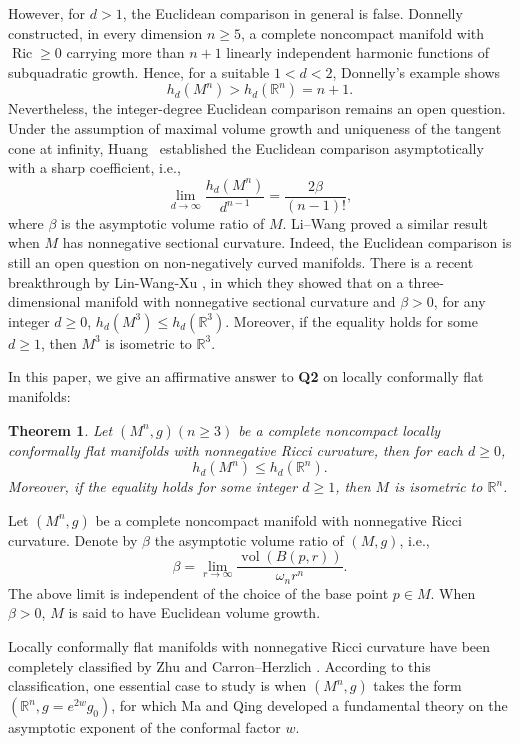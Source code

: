 \documentclass[12pt]{amsart}
\theoremstyle{plain}
\newtheorem{theoremx}{Theorem}
\theoremstyle{definition}
\theoremstyle{remark}     %
\numberwithin{equation}{section}
\begin{document}
However, for $d>1$, the Euclidean comparison in general is false. Donnelly \cite{D} constructed, in every dimension $n\ge5$, a complete noncompact manifold with $\operatorname{Ric}\ge0$ carrying more than $n+1$ linearly independent harmonic functions of subquadratic growth. Hence, for a suitable $1<d<2$, Donnelly’s example shows
\[
h_d(M^n)>h_d(\mathbb R^n)=n+1.
\]
Nevertheless, the integer-degree Euclidean comparison remains an open question. Under the assumption of maximal volume growth and uniqueness of the tangent cone at infinity, Huang~\cite{H1,H2} established the Euclidean comparison asymptotically with a sharp coefficient, i.e., 
\[
\lim_{d\to \infty} \frac{h_d(M^n)}{d^{n-1}}= \frac{2\beta}{(n-1)!}, 
\]
where $\beta$ is the asymptotic volume ratio of $M$.
Li--Wang \cite{LW} proved a similar result when $M$ has nonnegative sectional curvature. Indeed, the Euclidean comparison is still an open question on non-negatively curved manifolds. There is a recent breakthrough by Lin-Wang-Xu \cite{LWX}, in which they showed that on a three-dimensional manifold with nonnegative sectional curvature and $\beta>0$, for any integer $d\geq 0$, $h_d(M^3)\leq h_d(\mathbb{R}^3)$. Moreover, if the equality holds for some $d\geq 1$, then $M^3$ is isometric to $\mathbb{R}^3$. 

In this paper, we give an affirmative answer to {\bf Q2} on locally conformally flat manifolds:  

\begin{theoremx} \label{thm:A}
Let $(M^n,g) (n\geq 3)$ be a complete noncompact locally conformally flat manifolds with nonnegative Ricci curvature, then for each $d\geq 0$,
\[
h_d(M^n) \leq h_d (\mathbb{R}^n). 
\]
Moreover, if the equality holds for some integer $d\geq 1$, then $M$ is isometric to $\mathbb{R}^n$.    
\end{theoremx}

Let  $(M^n,g)$ be a complete noncompact manifold with nonnegative Ricci curvature. Denote by $\beta$ the asymptotic volume ratio of $(M,g)$, i.e., \[
    \beta=\lim_{r\to \infty}\frac{\operatorname{vol}(B(p,r))}{\omega_nr^n}.
    \]
The above limit is independent of the choice of the base point $p\in M$. When $\beta>0$, $M$ is said to have Euclidean volume growth.

Locally conformally flat manifolds with nonnegative Ricci curvature have been completely classified by Zhu \cite{Z} and Carron--Herzlich \cite{CH}. According to this classification, one essential case to study is when $(M^n, g)$ takes the form $(\mathbb{R}^n, g=e^{2w}g_0)$, for which Ma and Qing \cite{MQ} developed a fundamental theory on the asymptotic exponent of the conformal factor $w$.
\end{document}
